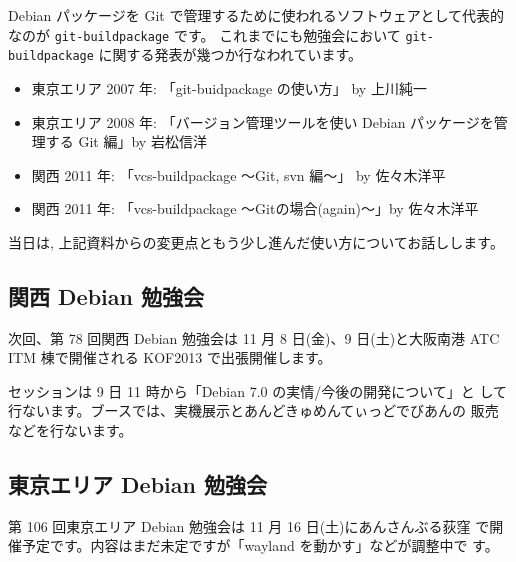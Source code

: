 \documentclass[mingoth,a4paper]{jsarticle}
\begin{document}
Debian パッケージを Git で管理するために使われるソフトウェアとして代表的なのが
\texttt{git-buildpackage} です。
これまでにも勉強会において
\texttt{git-buildpackage} に関する発表が幾つか行なわれています。
\begin{itemize}
\item 東京エリア 2007 年: 「git-buidpackage の使い方」 by 上川純一
\item 東京エリア 2008 年: 「バージョン管理ツールを使い Debian パッケージを管理する Git 編」by 岩松信洋
\item 関西 2011 年: 「vcs-buildpackage 〜Git, svn 編〜」 by 佐々木洋平
\item 関西 2011 年: 「vcs-buildpackage 〜Gitの場合(again)〜」by 佐々木洋平
\end{itemize}
当日は, 上記資料からの変更点ともう少し進んだ使い方についてお話しします。



\subsection{関西 Debian 勉強会}

次回、第 78 回関西 Debian 勉強会は 11 月 8 日(金)、9 日(土)と大阪南港
ATC ITM 棟で開催される KOF2013 で出張開催します。

セッションは 9 日 11 時から「Debian 7.0 の実情/今後の開発について」と
して行ないます。ブースでは、実機展示とあんどきゅめんてぃっどでびあんの
販売などを行ないます。


\subsection{東京エリア Debian 勉強会}

第 106 回東京エリア Debian 勉強会は 11 月 16 日(土)にあんさんぶる荻窪
で開催予定です。内容はまだ未定ですが「wayland を動かす」などが調整中で
す。

%
\mbox{}\newpage
\mbox{}\newpage

\printindex
\end{document}
